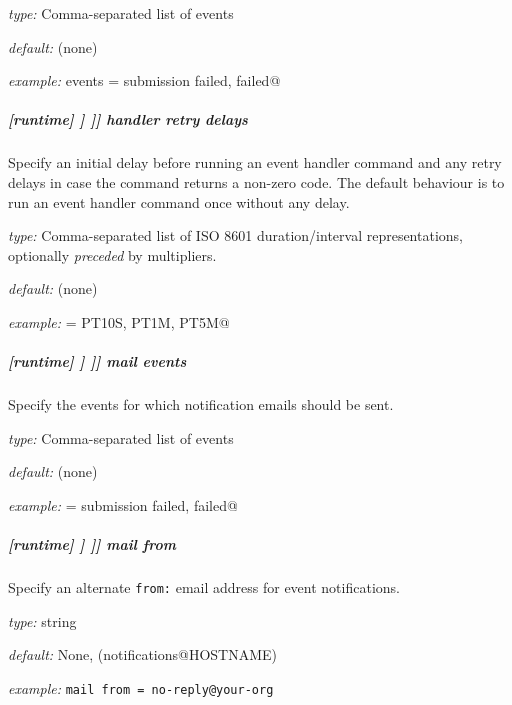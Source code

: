 \begin{myitemize}
    \item {\em type:} Comma-separated list of events
    \item {\em default:} (none)
    \item {\em example:} \lstinline@handler events = submission failed, failed@
\end{myitemize}

\subparagraph[handler retry delays]{[runtime] \textrightarrow [[\_\_NAME\_\_]] \textrightarrow [[[events]]] \textrightarrow handler retry delays}
\label{runtime-events-handler-retry-delays}

Specify an initial delay before running an event handler command and any retry
delays in case the command returns a non-zero code. The default behaviour is to
run an event handler command once without any delay.

\begin{myitemize}
    \item {\em type:} Comma-separated list of ISO 8601 duration/interval representations, optionally {\em preceded} by multipliers.
    \item {\em default:} (none)
    \item {\em example:} \lstinline@handler = PT10S, PT1M, PT5M@
\end{myitemize}

\subparagraph[mail events]{[runtime] \textrightarrow [[\_\_NAME\_\_]] \textrightarrow [[[events]]] \textrightarrow mail events}

Specify the events for which notification emails should be sent.

\begin{myitemize}
    \item {\em type:} Comma-separated list of events
    \item {\em default:} (none)
    \item {\em example:} \lstinline@handler = submission failed, failed@
\end{myitemize}

\subparagraph[mail from]{[runtime] \textrightarrow [[\_\_NAME\_\_]] \textrightarrow [[[events]]] \textrightarrow mail from}

Specify an alternate \lstinline=from:= email address for event notifications.

\begin{myitemize}
    \item {\em type:} string
    \item {\em default:} None, (notifications@HOSTNAME)
    \item {\em example:} \lstinline|mail from = no-reply@your-org|
\end{myitemize}

